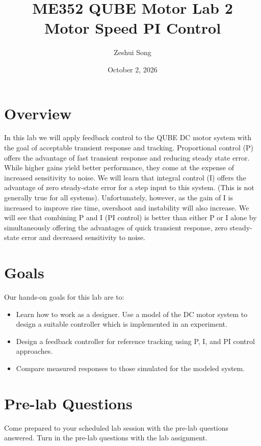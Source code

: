 ﻿\documentclass[12pt]{article}
\title{ME352 QUBE Motor Lab 2\\Motor Speed PI Control}
\author{Zeshui Song}
\date{October 2, 2026}
\begin{document}
\maketitle

\section{Overview}
In this lab we will apply feedback control to the QUBE DC motor system with the goal of acceptable transient response and tracking. Proportional control (P) offers the advantage of fast transient response and reducing steady state error. While higher gains yield better performance, they come at the expense of increased sensitivity to noise. We will learn that integral control (I) offers the advantage of zero steady-state error for a step input to this system. (This is not generally true for all systems). Unfortunately, however, as the gain of I is increased to improve rise time, overshoot and instability will also increase. We will see that combining P and I (PI control) is better than either P or I alone by simultaneously offering the advantages of quick transient response, zero steady-state error and decreased sensitivity to noise.

\section{Goals}
Our hands-on goals for this lab are to:
\begin{itemize}
    \item Learn how to work as a designer. Use a model of the DC motor system to design a suitable controller which is implemented in an experiment.
    \item Design a feedback controller for reference tracking using P, I, and PI control approaches.
    \item Compare measured responses to those simulated for the modeled system.
\end{itemize}

\section{Pre-lab Questions}
Come prepared to your scheduled lab session with the pre-lab questions answered. Turn in the pre-lab questions with the lab assignment.
\end{document}
